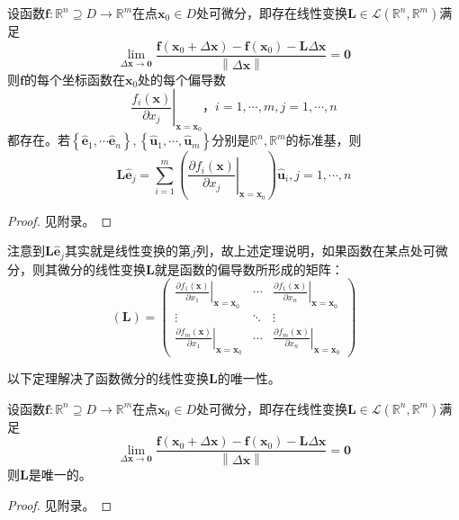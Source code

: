 \documentclass[main.tex]{subfiles}
\begin{document}
\begin{theorem}\label{thm:II.4.7}
    设函数$\mathbf{f}:\mathbb{R}^n\supseteq D\rightarrow\mathbb{R}^m$在点$\mathbf{x}_0\in D$处可微分，即存在线性变换$\mathbf{L}\in\mathcal{L}\left(\mathbb{R}^n,\mathbb{R}^m\right)$满足
    \[
        \lim_{\Delta\mathbf{x}\to\mathbf{0}}\frac{\mathbf{f}\left(\mathbf{x}_0+\Delta \mathbf{x}\right)-\mathbf{f}\left(\mathbf{x}_0\right)-\mathbf{L}\Delta\mathbf{x}}{\left\|\Delta\mathbf{x}\right\|}=\mathbf{0}
    \]
    则$\mathbf{f}$的每个坐标函数在$\mathbf{x}_0$处的每个偏导数
    \[
        \left.\frac{f_i\left(\mathbf{x}\right)}{\partial x_j}\right|_{\mathbf{x}=\mathbf{x}_0}，i=1,\cdots,m,j=1,\cdots,n
    \]
    都存在。若$\left\{\mathbf{\hat{e}}_1,\cdots\mathbf{\hat{e}}_n\right\},\left\{\mathbf{\hat{u}}_1,\cdots,\mathbf{\hat{u}}_m\right\}$分别是$\mathbb{R}^n,\mathbb{R}^m$的标准基，则
    \[
        \mathbf{L\hat{e}}_j=\sum_{i=1}^m\left(\left.\frac{\partial f_i\left(\mathbf{x}\right)}{\partial x_j}\right|_{\mathbf{x}=\mathbf{x}_0}\right)\mathbf{\hat{u}}_i,j=1,\cdots,n
    \]
\end{theorem}
\begin{proof}
    见附录。
\end{proof}

注意到$\mathbf{L\hat{e}}_j$其实就是线性变换的第$j$列，故上述定理说明，如果函数在某点处可微分，则其微分的线性变换$\mathbf{L}$就是函数的偏导数所形成的矩阵：
\[
    \left(\mathbf{L}\right)=\left(\begin{array}{ccc}
            \left.\frac{\partial f_1\left(\mathbf{x}\right)}{\partial x_1}\right|_{\mathbf{x}=\mathbf{x}_0} & \cdots & \left.\frac{\partial f_1\left(\mathbf{x}\right)}{\partial x_n}\right|_{\mathbf{x}=\mathbf{x}_0} \\
            \vdots                                                                                          & \ddots & \vdots                                                                                          \\
            \left.\frac{\partial f_m\left(\mathbf{x}\right)}{\partial x_1}\right|_{\mathbf{x}=\mathbf{x}_0} & \cdots & \left.\frac{\partial f_m\left(\mathbf{x}\right)}{\partial x_n}\right|_{\mathbf{x}=\mathbf{x}_0}
        \end{array}\right)
\]

以下定理解决了函数微分的线性变换$\mathbf{L}$的唯一性。

\begin{theorem}\label{thm:II.4.8}
    设函数$\mathbf{f}:\mathbb{R}^n\supseteq D\rightarrow\mathbb{R}^m$在点$\mathbf{x}_0\in D$处可微分，即存在线性变换$\mathbf{L}\in\mathcal{L}\left(\mathbb{R}^n,\mathbb{R}^m\right)$满足
    \[
        \lim_{\Delta\mathbf{x}\to\mathbf{0}}\frac{\mathbf{f}\left(\mathbf{x}_0+\Delta \mathbf{x}\right)-\mathbf{f}\left(\mathbf{x}_0\right)-\mathbf{L}\Delta\mathbf{x}}{\left\|\Delta\mathbf{x}\right\|}=\mathbf{0}
    \]
    则$\mathbf{L}$是唯一的。
\end{theorem}
\begin{proof}
    见附录。
\end{proof}
\end{document}
